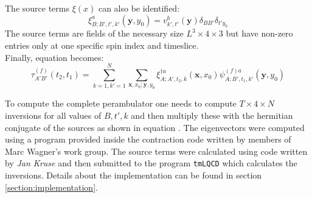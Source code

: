     \noindent
    The source terms $\xi(x)$ can also be identified:
    \begin{equation}
        \xi^a_{B;B',t',k'}(\textbf{y},y_0) =  v_{k',t'}^{b}(\textbf{y})\delta_{BB'}\delta_{t'y_0}
    \end{equation}
    The source terms are fields of the necessary size $L^3 \times 4 \times 3$ but have non-zero entries only at one specific spin index and timeslice.\\
    
    \noindent
    Finally, equation  becomes:
    \begin{equation}\label{perambulator_with_inversion}
        \tau^{(f)}_{A'B'}(t_2,t_1) = \sum_{k=1,k'=1}^N \sum_{\textbf{x},x_0;\textbf{y},y_0} \xi^{\dagger a}_{A;A',t_2,k}(\textbf{x},x_0) \psi^{(f)a}_{A;B',t_1,k'}(\textbf{y},y_0) 
    \end{equation}
    
    \noindent
    To compute the complete perambulator one needs to compute $T \times 4 \times N$ inversions for all values of $B,t',k$ and then multiply these with the hermitian conjugate of the sources as shown in equation . The eigenvectors were computed using a program provided inside the contraction code written by members of Marc Wagner's work group. The source terms were calculated using code written by \textit{Jan Kruse} \cite{bachelor_thesis_jan} and then submitted to the program \verb+tmLQCD+ \cite{jansen_urbach_2009} which calculates the inversions. Details about the implementation can be found in section \ref{section:implementation}.
    
